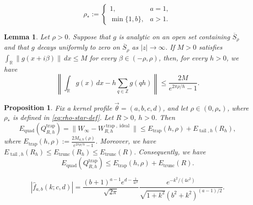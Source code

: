 \documentclass[10pt,a4paper]{amsart}
\newtheorem{lem}{Lemma}
\newtheorem{prop}{Proposition}
\begin{document}
\begin{equation}\label{eq:rho-star-def}
\rho_\ast := \begin{cases} 1, & a=1,\\ \min\{1,b\}, & a>1. \end{cases}
\end{equation}

\begin{lem}\label{infinite-line-trapezoidal-estimate}
Let \(\rho>0\). Suppose that \(g\) is analytic on an open set containing \(\overline S_\rho\) and that \(g\) decays uniformly to zero on \(\overline S_\rho\) as \(|z|\to\infty\). If \(M>0\) satisfies $\int_{\mathbb R}\|g(x+i\beta)\|\,dx\le M$
for every \(\beta\in(-\rho,\rho)\), then, for every \(h>0\), we have
\begin{equation}\label{eq:trap-infinite-line}
\left\|\int_{\mathbb R}g(x)\,dx-h\sum_{q\in\mathbb Z}g(qh)\right\|\le \frac{2M}{e^{2\pi \rho/h}-1}.
\end{equation}
\end{lem}

\begin{prop}\label{uniform-lattice-quadrature}
Fix a kernel profile \(\vec{\theta}=(a,b,c,d)\), and let \(\rho\in(0,\rho_\ast)\), where \(\rho_\ast\) is defined in \cref{eq:rho-star-def}. Let \(R>0\), \(h>0\). Then
\begin{equation}\label{eq:uniform-lattice-error}
E_{\operatorname{quad}}(Q_{R,h}^{\operatorname{trap}}) = \|W_\infty-W_{R,h}^{\operatorname{trap},\operatorname{ideal}}\| \le E_{\operatorname{trap}}(h,\rho)+E_{\operatorname{tail},h}(R_h),
\end{equation}
where \(E_{\operatorname{trap}}(h,\rho):=\frac{2M_{a,b}(\rho)}{e^{2\pi \rho/h}-1}\). Moreover, we have $E_{\operatorname{tail},h}(R_h)\le E_{\operatorname{trunc}}(R_h)\le E_{\operatorname{trunc}}(R)$. 
Consequently, we have
\begin{equation}\label{eq:uniform-lattice-error-simple}
E_{\operatorname{quad}}(Q_{R,h}^{\operatorname{trap}})\le E_{\operatorname{trap}}(h,\rho)+E_{\operatorname{trunc}}(R).
\end{equation}
\end{prop}

\begin{equation}\label{eq:real-kernel-modulus}
|\hat f_{a,b}(k;c,d)| = \frac{(b+1)^{a-1}e^{d-\frac{1}{4c^2}}}{\sqrt{2\pi}}\frac{e^{-k^2/(4c^2)}}{\sqrt{1+k^2}(b^2+k^2)^{(a-1)/2}}.
\end{equation}
\end{document}
